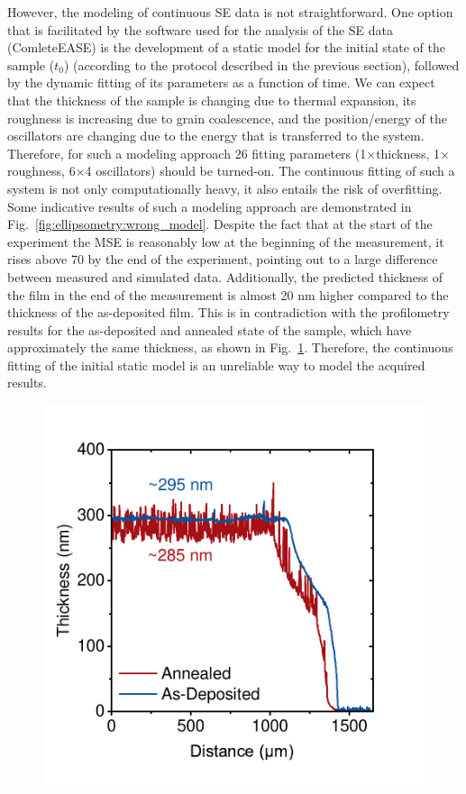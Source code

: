 However, the modeling of continuous SE data is not straightforward. One option that is facilitated by the software used for the analysis of the SE data (ComleteEASE) is the development of a static model for the initial state of the sample ($t_0$) (according to the protocol described in the previous section), followed by the dynamic fitting of its parameters as a function of time. We can expect that the thickness of the sample is changing due to thermal expansion, its roughness is increasing due to grain coalescence, and the position/energy of the oscillators are changing due to the energy that is transferred to the system. Therefore, for such a modeling approach 26 fitting parameters (1$\times$thickness, 1$\times$roughness, 6$\times$4 oscillators) should be turned-on. The continuous fitting of such a system is not only computationally heavy, it also entails the risk of overfitting. Some indicative results of such a modeling approach are demonstrated in Fig.~\ref{fig:ellipsometry:wrong_model}. Despite the fact that at the start of the experiment the MSE is reasonably low at the beginning of the measurement, it rises above 70 by the end of the experiment, pointing out to a large difference between measured and simulated data. Additionally, the predicted thickness of the film in the end of the measurement is almost 20 nm higher compared to the thickness of the as-deposited film. This is in contradiction with the profilometry results for the as-deposited and annealed state of the sample, which have approximately the same thickness, as shown in Fig.~\ref{fig:ellipsometry:profilometry}. Therefore, the continuous fitting of the initial static model is an unreliable way to model the acquired results. 


\begin{figure}
  \centering
  \medskip
  \includegraphics[width=.45\textwidth]{chapters/ellipsometry/image/Dektak.pdf}
  \caption{}
  \label{fig:ellipsometry:profilometry}
\end{figure}

